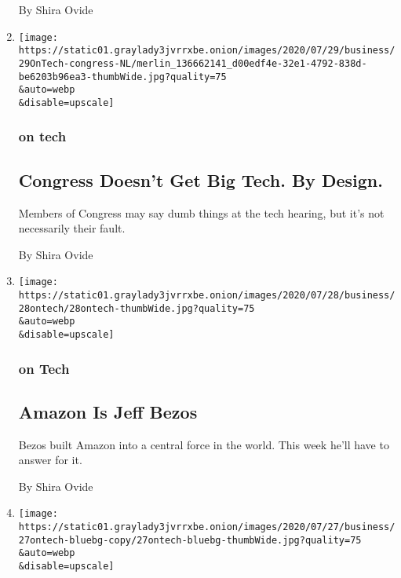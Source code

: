 \begin{enumerate}
  By Shira Ovide
\item
  \href{/2020/07/29/technology/congress-big-tech.html}{}

  \texttt{[image: https://static01.graylady3jvrrxbe.onion/images/2020/07/29/business/29OnTech-congress-NL/merlin\_136662141\_d00edf4e-32e1-4792-838d-be6203b96ea3-thumbWide.jpg?quality=75\\\&auto=webp\\\&disable=upscale]}

  \hypertarget{on-tech-2}{%
  \subsubsection{on tech}\label{on-tech-2}}

  \hypertarget{congress-doesnt-get-big-tech-by-design}{%
  \subsection{Congress Doesn't Get Big Tech. By
  Design.}\label{congress-doesnt-get-big-tech-by-design}}

  Members of Congress may say dumb things at the tech hearing, but it's
  not necessarily their fault.

  By Shira Ovide
\item
  \href{/2020/07/28/technology/amazon-jeff-bezos.html}{}

  \texttt{[image: https://static01.graylady3jvrrxbe.onion/images/2020/07/28/business/28ontech/28ontech-thumbWide.jpg?quality=75\\\&auto=webp\\\&disable=upscale]}

  \hypertarget{on-tech-3}{%
  \subsubsection{on Tech}\label{on-tech-3}}

  \hypertarget{amazon-is-jeff-bezos}{%
  \subsection{Amazon Is Jeff Bezos}\label{amazon-is-jeff-bezos}}

  Bezos built Amazon into a central force in the world. This week he'll
  have to answer for it.

  By Shira Ovide
\item
  \href{/2020/07/27/technology/tiktok-data-privacy.html}{}

  \texttt{[image: https://static01.graylady3jvrrxbe.onion/images/2020/07/27/business/27ontech-bluebg-copy/27ontech-bluebg-thumbWide.jpg?quality=75\\\&auto=webp\\\&disable=upscale]}


\end{enumerate}
